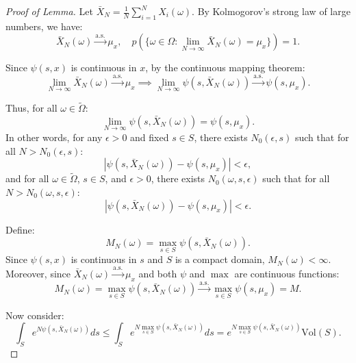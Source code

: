 \documentclass{article}
\theoremstyle{plain}
\theoremstyle{definition}
\theoremstyle{remark}
\begin{document}
\begin{proof}[Proof of Lemma]
Let $\bar{X}_N = \frac{1}{N} \sum_{i=1}^N X_i(\omega)$. By Kolmogorov's strong law of large numbers, we have:
\begin{equation}
\bar{X}_N(\omega) \xrightarrow{\text{a.s.}} \mu_x, \quad p\left(\{\omega \in \Omega : \lim_{N \to \infty} \bar{X}_N(\omega) = \mu_x\}\right) = 1.
\end{equation}

Since $\psi(s, x)$ is continuous in $x$, by the continuous mapping theorem:
\begin{equation}
\lim_{N \to \infty} \bar{X}_N(\omega) \xrightarrow{\text{a.s.}} \mu_x \implies \lim_{N \to \infty} \psi(s, \bar{X}_N(\omega)) \xrightarrow{\text{a.s.}} \psi(s, \mu_x).
\end{equation}

Thus, for all $\omega \in \tilde{\Omega}$:
\begin{equation}
\lim_{N \to \infty} \psi(s, \bar{X}_N(\omega)) = \psi(s, \mu_x).
\end{equation}
In other words, for any $\epsilon > 0$ and fixed $s \in S$, there exists $N_0(\epsilon, s)$ such that for all $N > N_0(\epsilon, s)$:
\begin{equation}
|\psi(s, \bar{X}_N(\omega)) - \psi(s, \mu_x)| < \epsilon,
\end{equation}
and for all $\omega \in \tilde{\Omega}$, $s \in S$, and $\epsilon > 0$, there exists $N_0(\omega, s, \epsilon)$ such that for all $N > N_0(\omega, s, \epsilon)$:
\begin{equation}
|\psi(s, \bar{X}_N(\omega)) - \psi(s, \mu_x)| < \epsilon.
\end{equation}

Define:
\begin{equation}
M_N(\omega) = \max_{s \in S} \psi(s, \bar{X}_N(\omega)).
\end{equation}
Since $\psi(s, x)$ is continuous in $s$ and $S$ is a compact domain, $M_N(\omega) < \infty$. Moreover, since $\bar{X}_N(\omega) \xrightarrow{\text{a.s.}} \mu_x$ and both $\psi$ and $\max$ are continuous functions:
\begin{equation}
M_N(\omega) = \max_{s \in S} \psi(s, \bar{X}_N(\omega)) \xrightarrow{\text{a.s.}} \max_{s \in S} \psi(s, \mu_x) = M.
\end{equation}

Now consider:
\begin{equation}
\int_S e^{N \psi(s, \bar{X}_N(\omega))} ds \leq \int_S e^{N \max_{s \in S} \psi(s, \bar{X}_N(\omega))} ds = e^{N \max_{s \in S} \psi(s, \bar{X}_N(\omega))} \text{Vol}(S).
\end{equation}


\end{proof}
\end{document}
